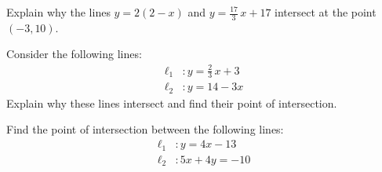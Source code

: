 \documentclass[11pt,letterpaper]{article}
\begin{document}

 Explain why the lines $y= 2(2 - x)$ and $y= \frac{17}{3}\,x + 17$ intersect at the point $(-3, 10)$. 



\newpage



 Consider the following lines:
	\[
	\begin{aligned}
	\ell_1&: y= \frac{2}{3}\,x + 3 \\[0.3cm]
	\ell_2&: y= 14 - 3x
	\end{aligned}
	\]
Explain why these lines intersect and find their point of intersection. 



\newpage



 Find the point of intersection between the following lines: 
	\[
	\begin{aligned}
	\ell_1&: y= 4x - 13 \\[0.3cm]
	\ell_2&: 5x + 4y= -10 
	\end{aligned}
	\]
\end{document}
